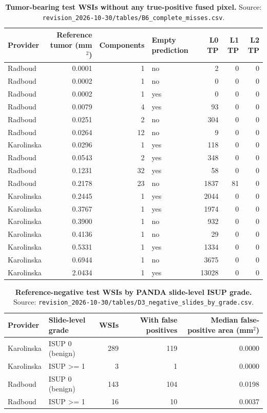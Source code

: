 \documentclass[10pt]{article}
\begin{document}
\begin{table}[H]\centering\footnotesize
\caption{\textbf{Tumor-bearing test WSIs without any true-positive fused pixel.} Source: \texttt{revision\_2026-10-30/tables/B6\_complete\_misses.csv}.}
\begin{tabular}{lrrlrrr}\toprule
Provider & Reference tumor (mm$^2$) & Components & Empty prediction & L0 TP & L1 TP & L2 TP\\\midrule
Radboud & 0.0001 & 1 & no & 2 & 0 & 0\\
Radboud & 0.0002 & 1 & no & 0 & 0 & 0\\
Radboud & 0.0002 & 1 & yes & 0 & 0 & 0\\
Radboud & 0.0079 & 4 & yes & 93 & 0 & 0\\
Radboud & 0.0251 & 2 & no & 304 & 0 & 0\\
Radboud & 0.0264 & 12 & no & 9 & 0 & 0\\
Karolinska & 0.0296 & 1 & yes & 118 & 0 & 0\\
Radboud & 0.0543 & 2 & yes & 348 & 0 & 0\\
Radboud & 0.1231 & 32 & yes & 58 & 0 & 0\\
Radboud & 0.2178 & 23 & no & 1837 & 81 & 0\\
Karolinska & 0.2445 & 1 & yes & 2044 & 0 & 0\\
Karolinska & 0.3767 & 1 & yes & 1974 & 0 & 0\\
Karolinska & 0.3900 & 1 & no & 932 & 0 & 0\\
Karolinska & 0.4136 & 1 & no & 29 & 0 & 0\\
Karolinska & 0.5331 & 1 & yes & 1334 & 0 & 0\\
Karolinska & 0.6944 & 1 & no & 3675 & 0 & 0\\
Karolinska & 2.0434 & 1 & yes & 13028 & 0 & 0\\
\bottomrule\end{tabular}\end{table}

\begin{table}[H]\centering\footnotesize
\caption{\textbf{Reference-negative test WSIs by PANDA slide-level ISUP grade.} Source: \texttt{revision\_2026-10-30/tables/D3\_negative\_slides\_by\_grade.csv}.}
\begin{tabular}{llrrr}\toprule
Provider & Slide-level grade & WSIs & With false positives & Median false-positive area (mm$^2$)\\\midrule
Karolinska & ISUP 0 (benign) & 289 & 119 & 0.0000\\
Karolinska & ISUP >= 1 & 3 & 1 & 0.0000\\
Radboud & ISUP 0 (benign) & 143 & 104 & 0.0198\\
Radboud & ISUP >= 1 & 16 & 10 & 0.0037\\
\bottomrule\end{tabular}\end{table}
\end{document}

